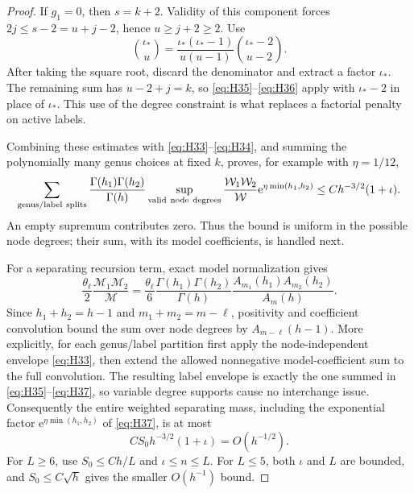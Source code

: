 \begin{proof}
If \(g_1=0\), then \(s=k+2\). Validity of this component forces
\(2j\le s-2=u+j-2\), hence \(u\ge j+2\ge2\). Use \[
\binom{\iota_*}u=\frac{\iota_*(\iota_*-1)}{u(u-1)}\binom{\iota_*-2}{u-2}.
\] After taking the square root, discard the denominator and extract a
factor \(\iota_*\). The remaining sum has \(u-2+j=k\), so \eqref{eq:H35}--\eqref{eq:H36} apply
with \(\iota_*-2\) in place of \(\iota_*\). This use of the degree constraint is
what replaces a factorial penalty on active labels.

Combining these estimates with \eqref{eq:H33}--\eqref{eq:H34}, and summing the
polynomially many genus choices at fixed \(k\), proves, for example with
\(\eta=1/12\), \begin{equation}
\sum_{\rm genus/label\ splits}
\frac{\Gamma(h_1)\Gamma(h_2)}{\Gamma(h)}
\sup_{\rm valid\ node\ degrees}
\frac{\mathcal W_1\mathcal W_2}{\mathcal W}
\mathrm{e}^{\eta\min(h_1,h_2)}
\le C h^{-3/2}(1+\iota).\label{eq:H37}
\end{equation} An empty supremum contributes zero. Thus the bound is uniform in the
possible node degrees; their sum, with its model coefficients, is
handled next.

For a separating recursion term, exact model normalization gives \begin{equation}
\frac{\theta_\ell}{2}\frac{\mathcal M_1\mathcal M_2}{\mathcal M}
=\frac{\theta_\ell}{6}
\frac{\Gamma(h_1)\Gamma(h_2)}{\Gamma(h)}
\frac{A_{m_1}(h_1)A_{m_2}(h_2)}{A_m(h)}.
\label{eq:H38}
\end{equation} Since \(h_1+h_2=h-1\) and \(m_1+m_2=m-\ell\), positivity and
coefficient convolution bound the sum over node degrees by
\(A_{m-\ell}(h-1)\). More explicitly, for each genus/label partition
first apply the node-independent envelope \eqref{eq:H33}, then extend the allowed
nonnegative model-coefficient sum to the full convolution. The resulting
label envelope is exactly the one summed in \eqref{eq:H35}--\eqref{eq:H37}, so variable
degree supports cause no interchange issue. Consequently the entire
weighted separating mass, including the exponential factor
\(\mathrm e^{\eta\min(h_1,h_2)}\) of \eqref{eq:H37}, is at most \begin{equation}
CS_0h^{-3/2}(1+\iota)=O(h^{-1/2}).
\label{eq:H39}
\end{equation} For \(L\ge6\), use \(S_0\le Ch/L\) and \(\iota\le n\le L\). For
\(L\le5\), both \(\iota\) and \(L\) are bounded, and \(S_0\le C\sqrt h\)
gives the smaller \(O(h^{-1})\) bound.
\end{proof}

